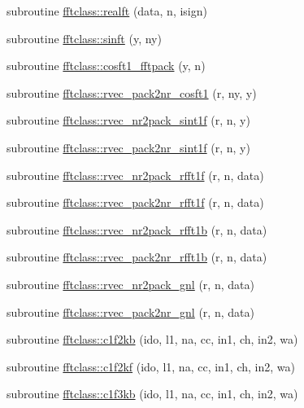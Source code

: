 \begin{DoxyCompactItemize}
\item 
subroutine \mbox{\hyperlink{namespacefftclass_a1aec6e8023ec23ff926a64c54c93ee1e}{fftclass\+::realft}} (data, n, isign)
\item 
subroutine \mbox{\hyperlink{namespacefftclass_abcd5ef700f07a29fa9949e15866f5d41}{fftclass\+::sinft}} (y, ny)
\item 
subroutine \mbox{\hyperlink{namespacefftclass_ac4347b89b0b1a5894943daa3f37c54ee}{fftclass\+::cosft1\+\_\+fftpack}} (y, n)
\item 
subroutine \mbox{\hyperlink{namespacefftclass_a8f3b38a9f0433b6b847b670b98acab99}{fftclass\+::rvec\+\_\+pack2nr\+\_\+cosft1}} (r, ny, y)
\item 
subroutine \mbox{\hyperlink{namespacefftclass_ae1f9bdd4e66db530852187dff115ae36}{fftclass\+::rvec\+\_\+nr2pack\+\_\+sint1f}} (r, n, y)
\item 
subroutine \mbox{\hyperlink{namespacefftclass_a667b3d13eccd40bf9e60f379f6d44e04}{fftclass\+::rvec\+\_\+pack2nr\+\_\+sint1f}} (r, n, y)
\item 
subroutine \mbox{\hyperlink{namespacefftclass_ac09ed442a8bb7846768adbe2d5c798c6}{fftclass\+::rvec\+\_\+nr2pack\+\_\+rfft1f}} (r, n, data)
\item 
subroutine \mbox{\hyperlink{namespacefftclass_ac898bf50e64ca8c43e8d9fa0c2c85919}{fftclass\+::rvec\+\_\+pack2nr\+\_\+rfft1f}} (r, n, data)
\item 
subroutine \mbox{\hyperlink{namespacefftclass_a78a858cc72da790e88dc826f5bdd14b3}{fftclass\+::rvec\+\_\+nr2pack\+\_\+rfft1b}} (r, n, data)
\item 
subroutine \mbox{\hyperlink{namespacefftclass_a49a850047c36eff6fb6d5eb1669cb009}{fftclass\+::rvec\+\_\+pack2nr\+\_\+rfft1b}} (r, n, data)
\item 
subroutine \mbox{\hyperlink{namespacefftclass_a2c47e8aa546c8ea9f5f23219be52d57e}{fftclass\+::rvec\+\_\+nr2pack\+\_\+gnl}} (r, n, data)
\item 
subroutine \mbox{\hyperlink{namespacefftclass_a5b968c02330134b7f60b0b19e3192e77}{fftclass\+::rvec\+\_\+pack2nr\+\_\+gnl}} (r, n, data)
\item 
subroutine \mbox{\hyperlink{namespacefftclass_a5b4381756639205cdda3aa66b4d3e98c}{fftclass\+::c1f2kb}} (ido, l1, na, cc, in1, ch, in2, wa)
\item 
subroutine \mbox{\hyperlink{namespacefftclass_a0535bb9fc14fda824be9053638cdfb2a}{fftclass\+::c1f2kf}} (ido, l1, na, cc, in1, ch, in2, wa)
\item 
subroutine \mbox{\hyperlink{namespacefftclass_af43eb54e0a7553e31585e67ad240b860}{fftclass\+::c1f3kb}} (ido, l1, na, cc, in1, ch, in2, wa)

\end{DoxyCompactItemize}
